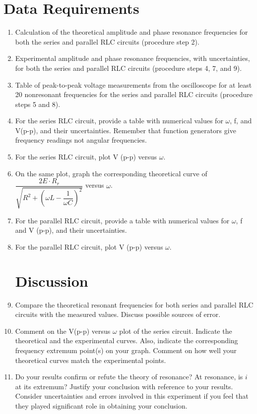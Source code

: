 \section{{\bf Data Requirements}}
\begin{enumerate}[resume]

\item Calculation of the theoretical amplitude and phase resonance frequencies for both the series and parallel RLC circuits (procedure step 2).

\item Experimental amplitude and phase resonance frequencies, with uncertainties, for both the series and parallel RLC circuits (procedure steps 4, 7, and 9).

\item Table of peak-to-peak voltage measurements from the oscilloscope for at least 20 nonresonant frequencies for the series and parallel RLC circuits (procedure steps 5 and 8).

\item For the series RLC circuit, provide a table with numerical values for $\omega$, f, and V(p-p), and their uncertainties. Remember that function generators give frequency readings not angular frequencies.

\item For the series RLC circuit, plot V (p-p) versus $\omega$.

\item On the same plot, graph the corresponding theoretical curve of $\dfrac{2E\cdot R_r}{\sqrt{R^2+\left(\omega L-\dfrac{1}{\omega C}\right)^2}}$ versus $\omega$.

\item For the parallel RLC circuit, provide a table with numerical values for $\omega$, f and V (p-p), and their uncertainties.

\item For the parallel RLC circuit, plot V (p-p) versus $\omega$.

\section{Discussion}
\item Compare the theoretical resonant frequencies for both series and parallel RLC circuits with the measured values. Discuss possible sources of error.

\item Comment on the V(p-p) versus $\omega$ plot of the series circuit. Indicate the theoretical and the experimental curves. Also, indicate the corresponding frequency extremum point(s) on your graph. Comment on how well your theoretical curves match the experimental points.

 \item Do your results confirm or refute the theory of resonance? At resonance, is $i$ at its extremum? Justify your conclusion with reference to your results. Consider uncertainties and errors involved in this experiment if you feel that they played significant role in obtaining your conclusion.

\end{enumerate}

